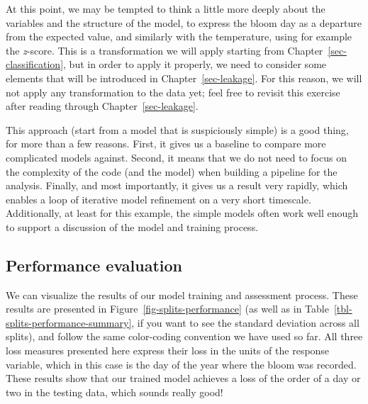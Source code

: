 \documentclass[
  letterpaper,
]{scrbook}
\begin{document}
At this point, we may be tempted to think a little more deeply about the
variables and the structure of the model, to express the bloom day as a
departure from the expected value, and similarly with the temperature,
using for example the \emph{z}-score. This is a transformation we will
apply starting from Chapter~\ref{sec-classification}, but in order to
apply it properly, we need to consider some elements that will be
introduced in Chapter~\ref{sec-leakage}. For this reason, we will not
apply any transformation to the data yet; feel free to revisit this
exercise after reading through Chapter~\ref{sec-leakage}.

This approach (start from a model that is suspiciously simple) is a good
thing, for more than a few reasons. First, it gives us a baseline to
compare more complicated models against. Second, it means that we do not
need to focus on the complexity of the code (and the model) when
building a pipeline for the analysis. Finally, and most importantly, it
gives us a result very rapidly, which enables a loop of iterative model
refinement on a very short timescale. Additionally, at least for this
example, the simple models often work well enough to support a
discussion of the model and training process.

\subsection{Performance evaluation}\label{performance-evaluation}

We can visualize the results of our model training and assessment
process. These results are presented in
Figure~\ref{fig-splits-performance} (as well as in
Table~\ref{tbl-splits-performance-summary}, if you want to see the
standard deviation across all splits), and follow the same color-coding
convention we have used so far. All three loss measures presented here
express their loss in the units of the response variable, which in this
case is the day of the year where the bloom was recorded. These results
show that our trained model achieves a loss of the order of a day or two
in the testing data, which sounds really good!
\end{document}
